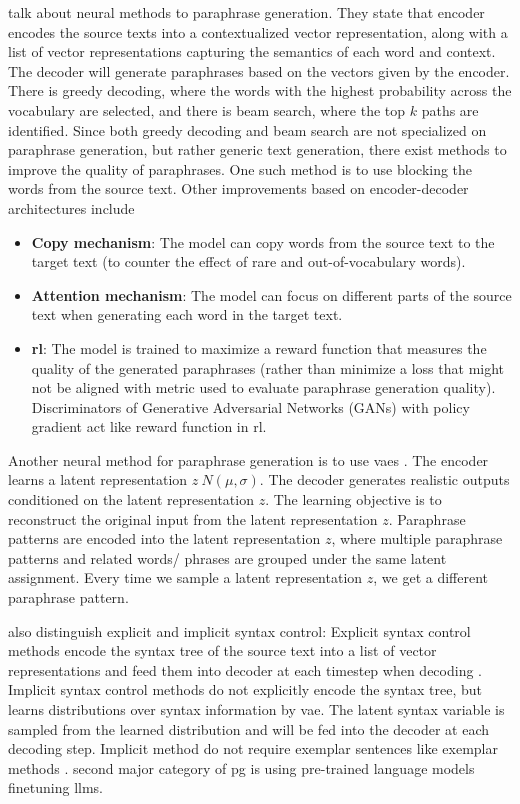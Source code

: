 \citet{zhou_paraphrase_2021} talk about neural methods to paraphrase generation.
They state that encoder encodes the source texts into a contextualized vector representation, 
along with a list of vector representations capturing the semantics of each word and context.
The decoder will generate paraphrases based on the vectors given by the encoder.
There is greedy decoding, where the words with the highest probability across the vocabulary are selected, 
and there is beam search, where the top $k$ paths are identified.
Since both greedy decoding and beam search are not specialized on paraphrase generation, but rather generic text generation, 
there exist methods to improve the quality of paraphrases.
One such method is to use blocking the words from the source text.
Other improvements based on encoder-decoder architectures include
\begin{itemize}
    \item \textbf{Copy mechanism}: The model can copy words from the source text to the target text (to counter the effect of rare and out-of-vocabulary words).
    \item \textbf{Attention mechanism}: The model can focus on different parts of the source text when generating each word in the target text.
    \item \textbf{\ac{rl}}: The model is trained to maximize a reward function that measures the quality of the generated paraphrases 
    (rather than minimize a loss that might not be aligned with metric used to evaluate paraphrase generation quality). 
    Discriminators of Generative Adversarial Networks (GANs) with policy gradient act like reward function in \ac{rl}.
\end{itemize}

Another neural method for paraphrase generation is to use \acp{vae} \cite{zhou_paraphrase_2021}.
The encoder learns a latent representation $z ~ N(\mu, \sigma)$.
The decoder generates realistic outputs conditioned on the latent representation $z$.
The learning objective is to reconstruct the original input from the latent representation $z$.
Paraphrase patterns are encoded into the latent representation $z$, where multiple paraphrase 
patterns and related words/ phrases are grouped under the same latent assignment.
Every time we sample a latent representation $z$, we get a different paraphrase pattern.

\citet{zhou_paraphrase_2021} also distinguish explicit and implicit syntax control:
Explicit syntax control methods encode the syntax tree of the source text into a list of vector representations 
and feed them into decoder at each timestep when decoding \cite{zhou_paraphrase_2021,palivela_optimization_2021}.
Implicit syntax control methods do not explicitly encode the syntax tree, 
but learns distributions over syntax information by \ac{vae}. 
The latent syntax variable is sampled from the learned distribution and will be fed into the decoder at each decoding step.
Implicit method do not require exemplar sentences like exemplar methods \cite{zhou_paraphrase_2021}.
\citet{palivela_optimization_2021} second major category of \ac{pg} is using pre-trained language models finetuning \acp{llm}.

